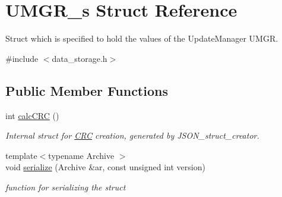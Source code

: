 \hypertarget{structUMGR__s}{}\section{U\+M\+G\+R\+\_\+s Struct Reference}
\label{structUMGR__s}


Struct which is specified to hold the values of the Update\+Manager U\+M\+GR.  




{\ttfamily \#include $<$data\+\_\+storage.\+h$>$}

\subsection*{Public Member Functions}
\begin{DoxyCompactItemize}
\item 
int \hyperlink{structUMGR__s_ae71a2770c3e37f1d859374359f99aae6}{calc\+C\+RC} ()
\begin{DoxyCompactList}\small\item\em Internal struct for \hyperlink{structCRC}{C\+RC} creation, generated by J\+S\+O\+N\+\_\+struct\+\_\+creator. \end{DoxyCompactList}\item 
{\footnotesize template$<$typename Archive $>$ }\\void \hyperlink{structUMGR__s_af85ccf0554e33a7f7163c0d26ca791eb}{serialize} (Archive \&ar, const unsigned int version)
\begin{DoxyCompactList}\small\item\em function for serializing the struct \end{DoxyCompactList}\end{DoxyCompactItemize}

